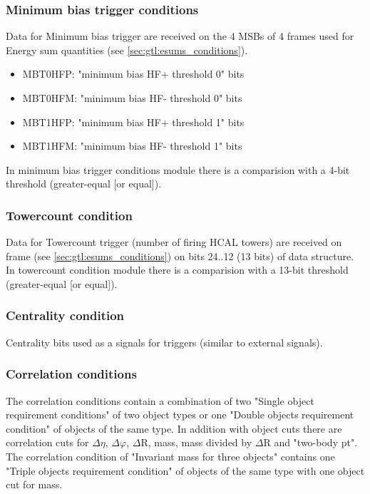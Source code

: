 \subsubsection{Minimum bias trigger conditions}
\label{sec:gtl:min_bias_conditions}

Data for Minimum bias trigger are received on the 4 MSBs of 4 frames used for Energy sum quantities (see \ref{sec:gtl:esums_conditions}).

\begin{itemize}
\item MBT0HFP: "minimum bias HF+ threshold 0" bits
\item MBT0HFM: "minimum bias HF- threshold 0" bits
\item MBT1HFP: "minimum bias HF+ threshold 1" bits
\item MBT1HFM: "minimum bias HF- threshold 1" bits
\end{itemize}

In minimum bias trigger conditions module there is a comparision with a 4-bit threshold (greater-equal [or equal]).

\subsubsection{Towercount condition}
\label{sec:gtl:towercount_cond}

Data for Towercount trigger (number of firing HCAL towers) are received on frame \htt (see \ref{sec:gtl:esums_conditions}) on bits 24..12 (13 bits) of \htt data structure.\\
In towercount condition module there is a comparision with a 13-bit threshold (greater-equal [or equal]).

\subsubsection{Centrality condition}
\label{sec:gtl:centrality_cond}

Centrality bits used as a signals for triggers (similar to external signals).

\clearpage

\subsubsection{Correlation conditions}
\label{sec:gtl:correlation_conditions}

The correlation conditions contain a combination of two "Single object requirement conditions" of two object types or one "Double objects requirement condition" of objects of the same type. In addition with object cuts there are correlation cuts for $\Delta\eta$, $\Delta\varphi$, $\Delta$R, mass, mass divided by $\Delta$R and "two-body pt".\\
The correlation condition of "Invariant mass for three objects" contains one "Triple objects requirement condition" of objects of the same type with one object cut for mass.

